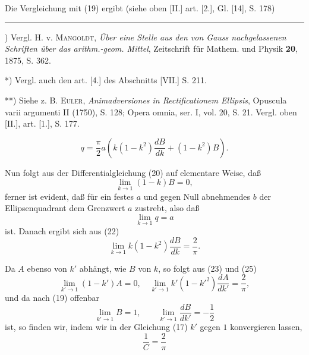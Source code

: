 \noindent Die Vergleichung mit (19) ergibt (siehe oben [II.] art. [2.], Gl. [14], S. 178)
\par\smallskip\noindent\rule{.25\linewidth}{.4pt}\par
{\small
\par\indent *) Vergl. H. v. \textsc{Mangoldt}, \textit{Über eine Stelle aus den von Gauss nachgelassenen Schriften über das arithm.-geom. Mittel}, Zeitschrift für Mathem. und Physik \textbf{20}, 1875, S. 362.
\par\indent **) Vergl. auch den art. [4.] des Abschnitts [VII.] S. 211.
\par\indent ***) Siehe z. B. \textsc{Euler}, \textit{Animadversiones in Rectificationem Ellipsis}, Opuscula varii argumenti II (1750), S. 128; Opera omnia, ser. I, vol. 20, S. 21. Vergl. oben [II.], art. [1.], S. 177.
\par}
\clearpage
\fancyhead{}
\begin{equation*}\tag*{(22)}q=\frac\pi2a\left(k(1-k^2)\frac{dB}{dk}+(1-k^2)B\right).\end{equation*}
\par\indent Nun folgt aus der Differentialgleichung (20) auf elementare Weise, daß
\begin{equation*}\tag*{(23)}\lim_{k\to1}(1-k)B=0,\end{equation*}
\noindent ferner ist  evident, daß für ein festes $a$ und gegen Null abnehmendes $b$ der Ellipsenquadrant dem Grenzwert $a$ zustrebt, also daß
\begin{equation*}\tag*{(24)}\lim_{k\to1}q=a\end{equation*}
\noindent ist. Danach ergibt sich aus (22)
\begin{equation*}\tag*{(25)}\lim_{k\to1}k(1-k^2)\frac{dB}{dk}=\frac2\pi.\end{equation*}
\par\indent Da $A$ ebenso von $k'$ abhängt, wie $B$ von $k$, so folgt aus (23) und (25)
\begin{equation*}\tag*{(26)}\lim_{k'\to1}(1-k')A=0,\quad\lim_{k'\to1}k'(1-k'^2)\frac{dA}{dk'}=\frac2\pi,\end{equation*}
\noindent und da nach (19) offenbar
\[\lim_{k'\to1}B=1,\qquad\lim_{k'\to1}\frac{dB}{dk'}=-\frac12\]
\noindent ist, so finden wir, indem wir in der Gleichung (17) $k'$ gegen $1$ konvergieren lassen,
\begin{equation*}\tag*{(27)}\frac1C=\frac2\pi\end{equation*}
